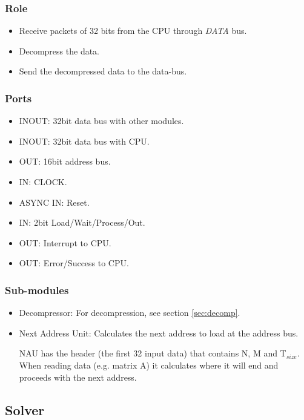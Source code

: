 \documentclass[12pt]{report}
\begin{document}
\subsubsection{Role}
\begin{itemize}
    \item Receive packets of 32 bits from the CPU through \emph{DATA} bus.
    \item Decompress the data.
    \item Send the decompressed data to the data-bus.
\end{itemize}

\subsubsection{Ports}
\begin{itemize}
    \item INOUT: 32bit data bus with other modules.
    \item INOUT: 32bit data bus with CPU.
    \item OUT: 16bit address bus.
    \item IN: CLOCK.
    \item ASYNC IN: Reset.
    \item IN: 2bit Load/Wait/Process/Out.
    \item OUT: Interrupt to CPU.
    \item OUT: Error/Success to CPU.
\end{itemize}

\subsubsection{Sub-modules}

\begin{itemize}
    \item {Decompressor}: For decompression, see section \ref{sec:decomp}.
    \item {Next Address Unit}: Calculates the next address to load at the address bus.
    
    {NAU} has the header (the first 32 input data) that contains N, M and T$_{size}$. When reading data (e.g. matrix A) it calculates where it will end and proceeds with the next address.
\end{itemize}

\subsection{Solver}
\end{document}
